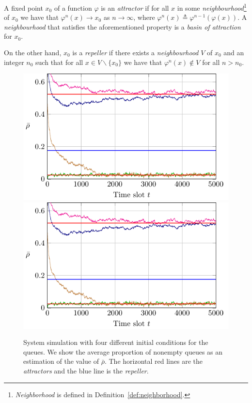 \begin{definition}
    A fixed point $x_0$ of a function $\varphi$ is an \textit{attractor} if for all $x$ in some \textit{neighbourhood}\footnote{\textit{Neighborhood} is defined in Definition~\ref{def:neighborhood}.} of $x_0$ we have that $\varphi^n(x) \to x_0$ as $n\to\infty$, where $\varphi^n(x)\triangleq \varphi^{n-1}(\varphi(x))$.
    A \textit{neighbourhood} that satisfies the aforementioned property is a \textit{basin of attraction} for $x_0$.
    
    On the other hand, $x_0$ is a \textit{repeller} if there exists a \textit{neighbourhood} $V$ of $x_0$ and an integer $n_0$ such that for all $x\in V\backslash\{x_0\}$ we have that $\varphi^n(x) \notin V$ for all $n > n_0$.
\end{definition}

\begin{figure}[H]
    \centering
    \if{}
        \includegraphics[]{Figures/Ch8_sim_fixed_point.pdf}
    \else
        \includegraphics[draft]{Figures/Ch8_sim_fixed_point.pdf}
    \fi
    \caption{System simulation with four different initial conditions for the queues.
    We show the average proportion of nonempty queues as an estimation of the value of $\bar\rho$.
    The horizontal red lines are the \textit{attractors} and the blue line is the \textit{repeller}.}
    \label{fig:sim_fixed_point}
\end{figure}

